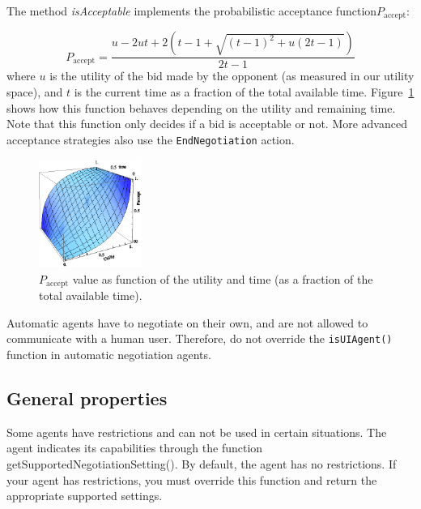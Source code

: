 \documentclass[]{article}
\begin{document}
The method \textit{isAcceptable} implements the probabilistic acceptance function$P_\text{accept}$:

\begin{equation}
	P_\text{accept} = \dfrac{u - 2ut + 2\left(t - 1 + \sqrt{(t - 1)^2 + u(2t - 1)}\right)}{2t - 1}
\end{equation}
where $u$ is the utility of the bid made by the opponent (as measured in our utility space), and $t$ is the current time as a fraction of the total available time. Figure~\ref{Fig:Paccept} shows how this function behaves depending on the utility and remaining time. Note that this function only decides if a bid is acceptable or not. More advanced acceptance strategies also use the \texttt{EndNegotiation} action.
\begin{figure}[htb]
	\centering
	\includegraphics[width=0.3\textwidth]{media/image21.png}
	\caption{$P_\text{accept}$ value as function of the utility and time (as a fraction of the total available time).}\label{Fig:Paccept}
\end{figure}
 
Automatic agents have to negotiate on their own, and are not allowed to communicate with a human user. Therefore, do not override the \texttt{isUIAgent()} function in automatic negotiation agents.

\subsection{General properties}
Some agents have restrictions and can not be used in certain situations. 
The agent indicates its capabilities through the function getSupportedNegotiationSetting().
By default, the agent has no restrictions. If your agent has restrictions, you must override
this function and return the appropriate supported settings.
\end{document}
